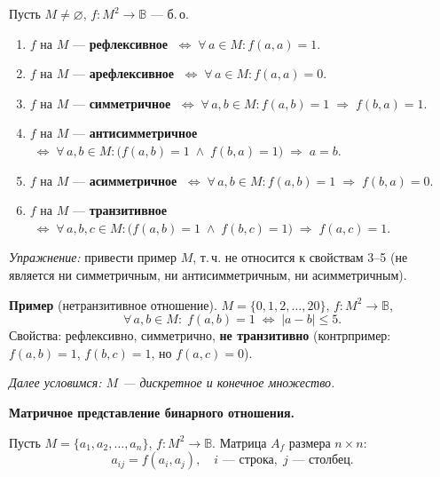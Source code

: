 Пусть $M \neq \varnothing$,\; $f\colon M^2 \to \mathbb{B}$ --- б.\,о.

\begin{enumerate}
  \item $f$ на $M$ --- \textbf{рефлексивное}
        $\;\Leftrightarrow\; \forall\, a \in M\colon f(a,a) = 1$.

  \item $f$ на $M$ --- \textbf{арефлексивное}
        $\;\Leftrightarrow\; \forall\, a \in M\colon f(a,a) = 0$.

  \item $f$ на $M$ --- \textbf{симметричное}
        $\;\Leftrightarrow\; \forall\, a, b \in M\colon f(a,b) = 1 \;\Rightarrow\; f(b,a) = 1$.

  \item $f$ на $M$ --- \textbf{антисимметричное}
        $\;\Leftrightarrow\; \forall\, a, b \in M\colon
        \bigl(f(a,b) = 1 \;\wedge\; f(b,a) = 1\bigr) \;\Rightarrow\; a = b$.

  \item $f$ на $M$ --- \textbf{асимметричное}
        $\;\Leftrightarrow\; \forall\, a, b \in M\colon
        f(a,b) = 1 \;\Rightarrow\; f(b,a) = 0$.

  \item $f$ на $M$ --- \textbf{транзитивное}
        $\;\Leftrightarrow\; \forall\, a, b, c \in M\colon
        \bigl(f(a,b) = 1 \;\wedge\; f(b,c) = 1\bigr) \;\Rightarrow\; f(a,c) = 1$.
\end{enumerate}

\medskip
\textit{Упражнение:} привести пример $M$, т.\,ч. не относится к свойствам 3--5
(не является ни симметричным, ни антисимметричным, ни асимметричным).


\bigskip
\textbf{Пример} (нетранзитивное отношение).
$M = \{0, 1, 2, \ldots, 20\}$,\; $f\colon M^2 \to \mathbb{B}$,
\[
  \forall\, a, b \in M\colon\;
  f(a,b) = 1 \;\Leftrightarrow\; |a - b| \leq 5.
\]
Свойства: рефлексивно, симметрично, \textbf{не транзитивно}
(контрпример: $f(a,b)=1$, $f(b,c)=1$, но $f(a,c)=0$).

\medskip
\textit{Далее условимся: $M$ --- дискретное и конечное множество.}

\medskip
\textbf{Матричное представление бинарного отношения.}

Пусть $M = \{a_1, a_2, \ldots, a_n\}$,\; $f\colon M^2 \to \mathbb{B}$.
Матрица $A_f$ размера $n \times n$:
\[
  a_{ij} = f(a_i, a_j), \quad
  i \text{ --- строка},\; j \text{ --- столбец}.
\]

